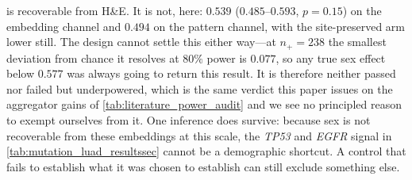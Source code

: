 \begin{flushleft}
is recoverable from H\&E. It is not, here: $0.539$
($0.485$--$0.593$, $p\!=\!0.15$) on the embedding channel and $0.494$ on
the pattern channel, with the site-preserved arm lower still. The design
cannot settle this either way---at $n_+\!=\!238$ the smallest deviation
from chance it resolves at $80\%$ power is $0.077$, so any true sex
effect below $0.577$ was always going to return this result. It is
therefore neither passed nor failed but underpowered, which is the same
verdict this paper issues on the aggregator gains of
\cref{tab:literature_power_audit} and we see no principled reason to
exempt ourselves from it. One inference does survive: because sex is not
recoverable from these embeddings at this scale, the \textit{TP53} and
\textit{EGFR} signal in \cref{tab:mutation_luad_resultssec} cannot be a
demographic shortcut. A control that fails to establish what it was
chosen to establish can still exclude something else.
\end{flushleft}
